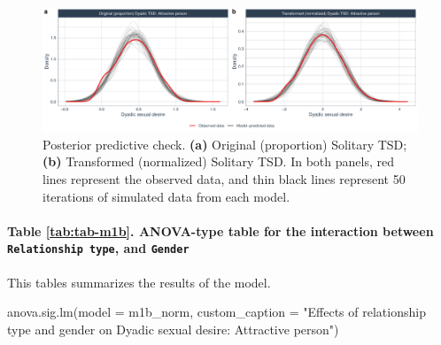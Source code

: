 \documentclass[
  bookmarksnumbered]{article}
\newenvironment{Shaded}{\begin{snugshade}}{\end{snugshade}}
\newcommand{\AttributeTok}[1]{\textcolor[rgb]{0.80,0.80,0.80}{#1}}
\newcommand{\FunctionTok}[1]{\textcolor[rgb]{0.94,0.94,0.56}{#1}}
\newcommand{\NormalTok}[1]{\textcolor[rgb]{0.80,0.80,0.80}{#1}}
\newcommand{\StringTok}[1]{\textcolor[rgb]{0.80,0.58,0.58}{#1}}
\begin{document}
\begin{figure}
\centering
\includegraphics{Sexual_Desire_Arousal_V2_files/figure-latex/ppc-m1b-1.pdf}
\caption{\label{fig:ppc-m1b}Posterior predictive check. \textbf{(a)} Original (proportion) Solitary TSD; \textbf{(b)} Transformed (normalized) Solitary TSD. In both panels, red lines represent the observed data, and thin black lines represent 50 iterations of simulated data from each model.}
\end{figure}

\paragraph{\texorpdfstring{Table \ref{tab:tab-m1b}. ANOVA-type table for the interaction between \texttt{Relationship\ type}, and \texttt{Gender}}{Table \ref{tab:tab-m1b}. ANOVA-type table for the interaction between Relationship type, and Gender}}\label{table-reftabtab-m1b.-anova-type-table-for-the-interaction-between-relationship-type-and-gender}

This tables summarizes the results of the model.

\begin{Shaded}
\begin{Highlighting}[]
\FunctionTok{anova.sig.lm}\NormalTok{(}\AttributeTok{model =}\NormalTok{ m1b\_norm, }\AttributeTok{custom\_caption =} \StringTok{"Effects of relationship type and gender on}
\StringTok{          Dyadic sexual desire: Attractive person"}\NormalTok{)}
\end{Highlighting}
\end{Shaded}
\end{document}
